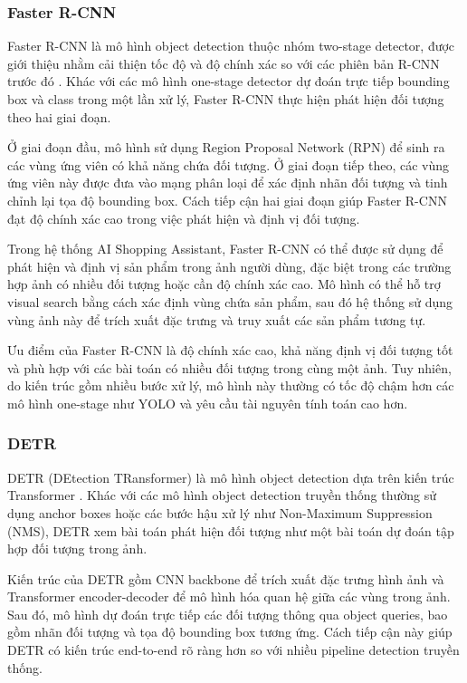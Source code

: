 \subsubsection{Faster R-CNN}

Faster R-CNN là mô hình object detection thuộc nhóm two-stage detector, được giới thiệu nhằm cải thiện tốc độ và độ chính xác so với các phiên bản R-CNN trước đó \textcite{ren2015fasterrcnn}. Khác với các mô hình one-stage detector dự đoán trực tiếp bounding box và class trong một lần xử lý, Faster R-CNN thực hiện phát hiện đối tượng theo hai giai đoạn.

Ở giai đoạn đầu, mô hình sử dụng Region Proposal Network (RPN) để sinh ra các vùng ứng viên có khả năng chứa đối tượng. Ở giai đoạn tiếp theo, các vùng ứng viên này được đưa vào mạng phân loại để xác định nhãn đối tượng và tinh chỉnh lại tọa độ bounding box. Cách tiếp cận hai giai đoạn giúp Faster R-CNN đạt độ chính xác cao trong việc phát hiện và định vị đối tượng.

Trong hệ thống AI Shopping Assistant, Faster R-CNN có thể được sử dụng để phát hiện và định vị sản phẩm trong ảnh người dùng, đặc biệt trong các trường hợp ảnh có nhiều đối tượng hoặc cần độ chính xác cao. Mô hình có thể hỗ trợ visual search bằng cách xác định vùng chứa sản phẩm, sau đó hệ thống sử dụng vùng ảnh này để trích xuất đặc trưng và truy xuất các sản phẩm tương tự.

Ưu điểm của Faster R-CNN là độ chính xác cao, khả năng định vị đối tượng tốt và phù hợp với các bài toán có nhiều đối tượng trong cùng một ảnh. Tuy nhiên, do kiến trúc gồm nhiều bước xử lý, mô hình này thường có tốc độ chậm hơn các mô hình one-stage như YOLO và yêu cầu tài nguyên tính toán cao hơn.
\subsubsection{DETR}

DETR (DEtection TRansformer) là mô hình object detection dựa trên kiến trúc Transformer \textcite{carion2020detr}. Khác với các mô hình object detection truyền thống thường sử dụng anchor boxes hoặc các bước hậu xử lý như Non-Maximum Suppression (NMS), DETR xem bài toán phát hiện đối tượng như một bài toán dự đoán tập hợp đối tượng trong ảnh.

Kiến trúc của DETR gồm CNN backbone để trích xuất đặc trưng hình ảnh và Transformer encoder-decoder để mô hình hóa quan hệ giữa các vùng trong ảnh. Sau đó, mô hình dự đoán trực tiếp các đối tượng thông qua object queries, bao gồm nhãn đối tượng và tọa độ bounding box tương ứng. Cách tiếp cận này giúp DETR có kiến trúc end-to-end rõ ràng hơn so với nhiều pipeline detection truyền thống.


